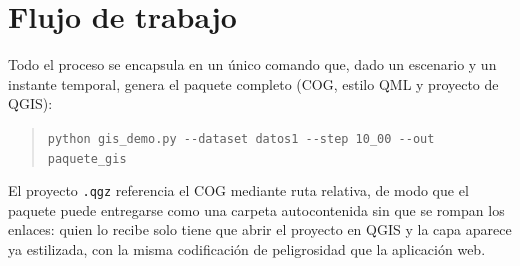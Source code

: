 \section{Flujo de trabajo}\label{g-flujo}

Todo el proceso se encapsula en un único comando que, dado un escenario y un instante temporal, genera el paquete completo (COG, estilo QML y proyecto de QGIS):

\begin{quote}
\texttt{python gis\_demo.py -{}-dataset datos1 -{}-step 10\_00 -{}-out paquete\_gis}
\end{quote}

El proyecto \texttt{.qgz} referencia el COG mediante ruta relativa, de modo que el paquete puede entregarse como una carpeta autocontenida sin que se rompan los enlaces: quien lo recibe solo tiene que abrir el proyecto en QGIS y la capa aparece ya estilizada, con la misma codificación de peligrosidad que la aplicación web.
